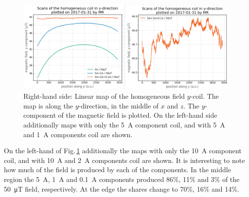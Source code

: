\begin{figure}
  \centering
  \includegraphics[width=0.9\linewidth]{gfx/prototype/linear_map.png}
  \caption{Right-hand side: Linear map of the homogeneous field $y$-coil. The map is along the $y$-direction, in the middle of $x$ and $z$. The $y$-component of the magnetic field is plotted. On the left-hand side additionally maps with only the \SI{5}{\ampere} component coil, and with \SI{5}{\ampere} and \SI{1}{\ampere} components coil are shown. }
  \label{fig:prototype_linear_map}
\end{figure}

On the left-hand of Fig.\,\ref{fig:prototype_linear_map} additionally the maps with only the \SI{10}{\ampere} component coil, and with \SI{10}{\ampere} and \SI{2}{\ampere} components coil are shown. It is interesting to note how much of the field is produced by each of the components. In the middle region the \SI{5}{\ampere}, \SI{1}{\ampere} and \SI{0.1}{\ampere} components produced 86\%, 11\% and 3\% of the \SI{50}{\micro\tesla} field, respectively. At the edge the shares change to 70\%, 16\% and 14\%.

